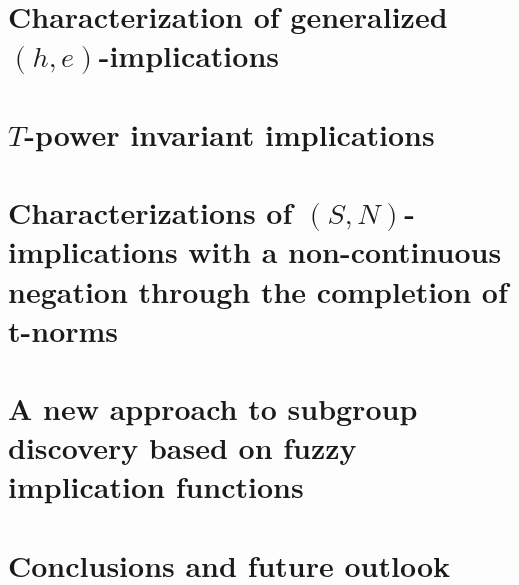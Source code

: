 \documentclass[
    colorlinks, 
    libertine,
]{uninathesis}
\theoremstyle{plain}
\begin{document}
	\chapter{Characterization of generalized $(h,e)$-implications}\label{chapter:heimplications}
	
	\chapter{$T$-power invariant implications}\label{chapter:tpowerinvariant}
	
	\chapter[Characterizations of $(S,N)$-implications with a non-continuous negation]{Characterizations of $(S,N)$-implications with a non-continuous negation through the completion of t-norms}\label{chapter:chsnimplications}
	
	\chapter[A new approach to subgroup discovery based on fuzzy implications]{A new approach to subgroup discovery based on fuzzy implication functions}\label{chapter:sd}
	
	\chapter{Conclusions and future outlook}\label{chapter:conclusions}
	

    \newpage
    \backmatter
    
    
    
	\pagestyle{backmatter}
    \printbibliography[heading=bibintoc]

                                     
   
\end{document}
